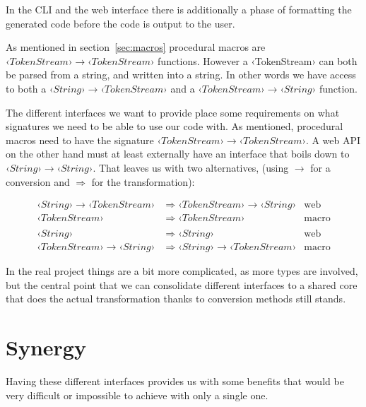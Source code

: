 In the CLI and the web interface there is additionally a phase of formatting the generated code before the code is output to the user.

As mentioned in section~\ref{sec:macros} procedural macros are $ ‹TokenStream› \rightarrow ‹TokenStream› $ functions. However a ‹TokenStream› can both be parsed from a string, and written into a string. In other words we have access to both a $ ‹String› \rightarrow ‹TokenStream› $ and a $ ‹TokenStream› \rightarrow ‹String› $ function.

The different interfaces we want to provide place some requirements on what signatures we need to be able to use our code with. As mentioned, procedural macros need to have the signature $ ‹TokenStream› \rightarrow ‹TokenStream› $. A web API on the other hand must at least externally have an interface that boils down to $ ‹String› \rightarrow ‹String› $. That leaves us with two alternatives, (using $\rightarrow$ for a conversion and $\Rightarrow$ for the transformation):

\begin{align*}
‹String› \rightarrow ‹TokenStream› &\Rightarrow ‹TokenStream› \rightarrow ‹String› & \text{web} \\
                   ‹TokenStream› &\Rightarrow ‹TokenStream›                    & \text{macro} \\
\\
                        ‹String› &\Rightarrow ‹String›                         & \text{web} \\
‹TokenStream› \rightarrow ‹String› &\Rightarrow ‹String› \rightarrow ‹TokenStream› & \text{macro}
\end{align*}

In the real project things are a bit more complicated, as more types are involved, but the central point that we can consolidate different interfaces to a shared core that does the actual transformation thanks to conversion methods still stands.

\section{Synergy}

Having these different interfaces provides us with some benefits that would be very difficult or impossible to achieve with only a single one.


